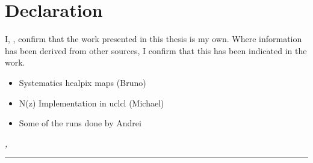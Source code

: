 %
\chapter*{Declaration}
\label{sec:declaration}
\thispagestyle{empty}

I, \thesisName , confirm that the work presented in this thesis is my own.
         Where information has been derived from other sources, I confirm that this has been indicated in the work.
         
\begin{itemize}
\item Systematics healpix maps (Bruno)
\item N(z) Implementation in uclcl (Michael)
\item Some of the runs done by Andrei
\end{itemize}

\bigskip

\noindent\textit{\thesisUniversityCity, \thesisDate}

\smallskip

\begin{flushright}
	\begin{minipage}{5cm}
		\rule{\textwidth}{1pt}
		\centering\thesisName
	\end{minipage}
\end{flushright}

